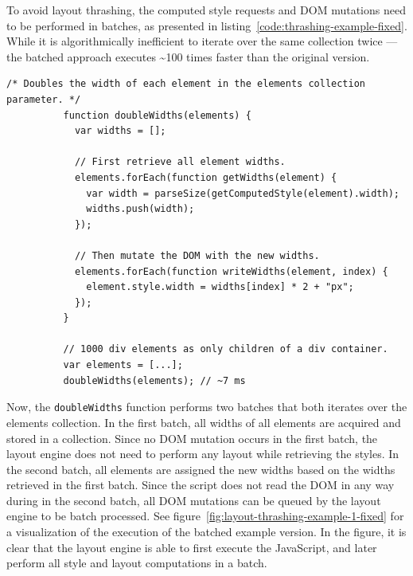 \documentclass[a4paper,11pt]{kth-mag}
\newcommand{\code}[1]{\texttt{#1}}
\begin{document}
        To avoid layout thrashing, the computed style requests and \gls{DOM} mutations need to be performed in batches, as presented in listing~\ref{code:thrashing-example-fixed}.
        While it is algorithmically inefficient to iterate over the same collection twice --- the batched approach executes \textasciitilde100 times faster than the original version.
        \begin{lstlisting}[gobble=10,caption={Example of avoiding layout thrashing by batch processing reads and writes to the \gls{DOM}. The code reads and double the widths of 1000 \glspl{element} in \textasciitilde7 ms.}, captionpos=b, label={code:thrashing-example-fixed}]
          /* Doubles the width of each element in the elements collection parameter. */
          function doubleWidths(elements) {
            var widths = [];

            // First retrieve all element widths.
            elements.forEach(function getWidths(element) {
              var width = parseSize(getComputedStyle(element).width);
              widths.push(width);
            });

            // Then mutate the DOM with the new widths.
            elements.forEach(function writeWidths(element, index) {
              element.style.width = widths[index] * 2 + "px";
            });
          }

          // 1000 div elements as only children of a div container.
          var elements = [...];
          doubleWidths(elements); // ~7 ms
        \end{lstlisting}
        Now, the \code{doubleWidths} function performs two batches that both iterates over the elements collection.
        In the first batch, all widths of all elements are acquired and stored in a collection.
        Since no \gls{DOM} mutation occurs in the first batch, the layout engine does not need to perform any layout while retrieving the styles.
        In the second batch, all elements are assigned the new widths based on the widths retrieved in the first batch.
        Since the script does not read the \gls{DOM} in any way during in the second batch, all \gls{DOM} mutations can be queued by the layout engine to be batch processed.
        See figure~\ref{fig:layout-thrashing-example-1-fixed} for a visualization of the execution of the batched example version.
        In the figure, it is clear that the layout engine is able to first execute the JavaScript, and later perform all style and layout computations in a batch.
\end{document}
